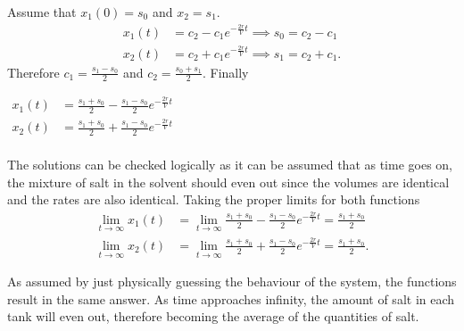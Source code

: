 \documentclass[../notes.tex]{subfiles}
\begin{document}
Assume that $x_1(0)=s_0$ and $x_2 = s_1$.
\begin{align*}
	x_1(t) &= c_2 - c_1 e^{-\frac{2r}{V}t} \implies s_0 = c_2 -c_1 \\
	x_2(t) &= c_2 + c_1 e^{-\frac{2r}{V}t} \implies s_1 = c_2 + c_1
.\end{align*}
Therefore $c_1=\frac{s_1 - s_0}{2}$ and $c_2=\frac{s_0 + s_1}{2}$. Finally
{
\newcommand{\constantone}{\frac{s_1 - s_0}{2}}
\newcommand{\constanttwo}{\frac{s_1 + s_0}{2}}
\begin{center}
\begin{eqbox}
	$\begin{aligned}
		x_1(t) &= \constanttwo - \constantone e^{-\frac{2r}{V}t} \\
		x_2(t) &= \constanttwo + \constantone e^{-\frac{2r}{V}t} \\
	\end{aligned}$
\end{eqbox}
\end{center}
The solutions can be checked logically as it can be assumed that as time goes on, the mixture of salt in the solvent should even out since the volumes are identical and the rates are also identical. Taking the proper limits for both functions
\begin{align*}
	\lim_{t \to \infty} x_1(t) &= \lim_{t \to \infty} \constanttwo - \constantone e^{-\frac{2r}{V}t} = \constanttwo\\
	\lim_{t \to \infty} x_2(t) &= \lim_{t \to \infty} \constanttwo + \constantone e^{-\frac{2r}{V}t} = \constanttwo.
\end{align*}

As assumed by just physically guessing the behaviour of the system, the functions result in the same answer. As time approaches infinity, the amount of salt in each tank will even out, therefore becoming the average of the quantities of salt.

}
\end{document}
